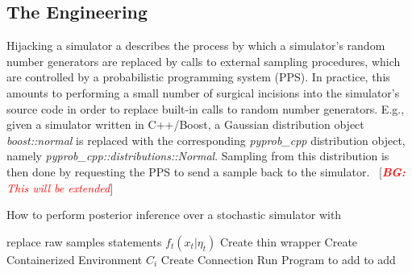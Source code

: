 \documentclass{article}
\newcommand{\bg}[1]{~{{[{\it \textcolor{red}{{\bf BG:} #1}}]}}}
\begin{document}
\subsection{The Engineering}
Hijacking a simulator a describes the process by which a simulator's random number generators are replaced by calls to external sampling procedures, which are controlled by a probabilistic programming system (PPS). In practice, this amounts to performing a small number of surgical incisions into the simulator's source code in order to replace built-in calls to random number generators. E.g., given a simulator written in C++/Boost\cite{schaling2011boost}, a Gaussian distribution object \textit{boost::normal} is replaced with the corresponding \textit{pyprob\_cpp} distribution object, namely \textit{pyprob\_cpp::distributions::Normal}. Sampling from this distribution is then done by requesting the PPS to send a sample back to the simulator. \bg{This will be extended}


 \label{sec:methods}

  \begin{algorithm}
   \caption{How to perform posterior inference over a stochastic simulator with 
   }
    \begin{algorithmic}[1]
      \Comment{}

        \State replace raw samples statements $f_{t}(x_{t} | \eta_{t}) $
        \State Create thin wrapper
        \State Create Containerized Environment $C_{i}$
        \State Create Connection
        \State Run Program
       \EndFunction
       \State to add
       \EndFunction
       \State to add
       \EndFunction


\end{algorithmic}
\end{algorithm}


\end{document}
